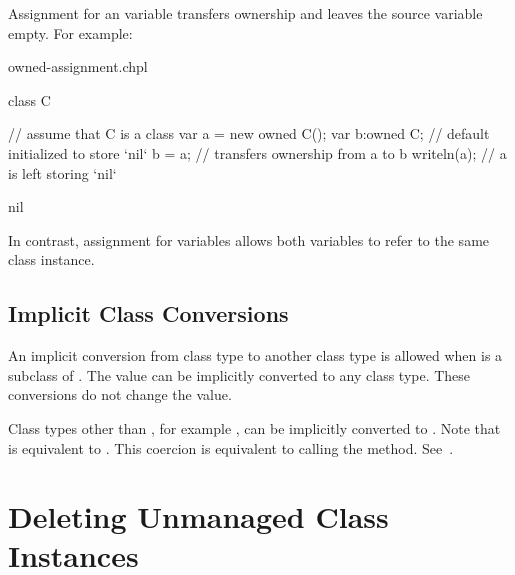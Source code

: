 Assignment for an  variable transfers ownership and leaves the
source variable empty. For example:

\begin{chapelexample}{owned-assignment.chpl}
\begin{chapelpre}
class C { }
\end{chapelpre}
\begin{chapel}
// assume that C is a class
var a = new owned C();
var b:owned C; // default initialized to store `nil`
b = a; // transfers ownership from a to b
writeln(a); // a is left storing `nil`
\end{chapel}
\begin{chapeloutput}
nil
\end{chapeloutput}
\end{chapelexample}

In contrast, assignment for  variables allows both
variables to refer to the same class instance.

\subsection{Implicit Class Conversions}
\label{Implicit_Class_Conversions}

An implicit conversion from class type  to
another class type  is allowed when  is a subclass
of .
The value  can be implicitly converted to any class type.
These conversions do not change the value.

Class types other than , for example , can
be implicitly converted to . Note that  is
equivalent to .  This coercion is equivalent to calling
the  method.  See~.

\section{Deleting Unmanaged Class Instances}
\label{Class_Delete}

